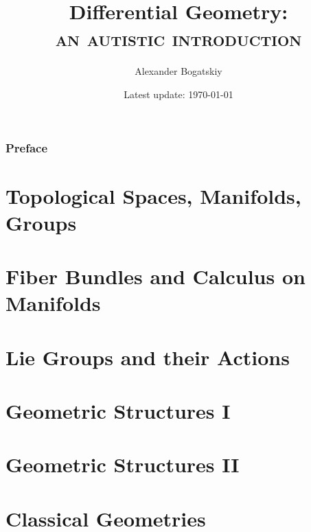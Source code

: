 \documentclass[english,a5paper]{book}%
\begin{document}
\title{
    {\Large{}Differential Geometry:}\\
    \textsc{an autistic introduction}
    }
\author{Alexander Bogatskiy}
\date{Latest update: \today}

\maketitle

\tableofcontents{}

\clearpage
\printglossary[type=\acronymtype,title=Abbreviations,style=long,nonumberlist] %


\clearpage
\section*{Preface}



\part{Topological Spaces, Manifolds, Groups}



\clearpage
\part{Fiber Bundles and Calculus on Manifolds}



\clearpage
\part{Lie Groups and their Actions}\label{part Lie group actions}



\clearpage
\part{Geometric Structures I}\label{Part Structured Geom I}



\clearpage
\part{Geometric Structures II}\label{Part Structured Geom II}



\clearpage
\part{Classical Geometries}\label{Part Classical Geom}

\end{document}

